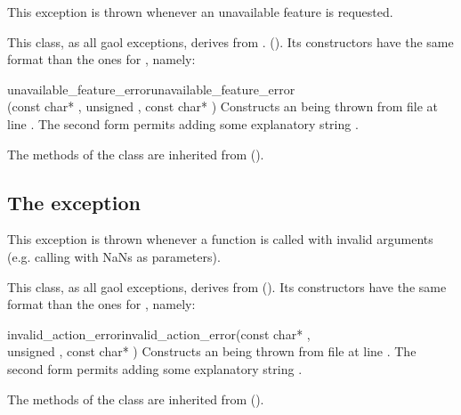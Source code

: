 \documentclass{manual}
\begin{document}
This exception is thrown whenever an unavailable feature is requested.

This class, as all gaol exceptions, derives from .
(). Its constructors have the same format
than the ones for , namely:

\begin{defmethod}{unavailable\_feature\_error}{}{unavailable\_feature\_error}{\\\hbox{}\hfill (const char* , unsigned , const char* )}
Constructs an  being thrown from file  at
line . The second form permits adding some explanatory string .
\end{defmethod}

The methods of the class are inherited from  ().

\subsection{The  exception}

This exception is thrown whenever a function is called with invalid arguments
(e.g. calling  with NaNs as parameters).

This class, as all gaol exceptions, derives from 
(). Its constructors have the same format
than the ones for , namely:

\begin{defmethod}{invalid\_action\_error}{}{invalid\_action\_error}{(const char* ,\\\hbox{}\hfill  unsigned , const char* )}
Constructs an  being thrown from file  at
line . The second form permits adding some explanatory string .
\end{defmethod}

The methods of the class are inherited from  ().
\end{document}
